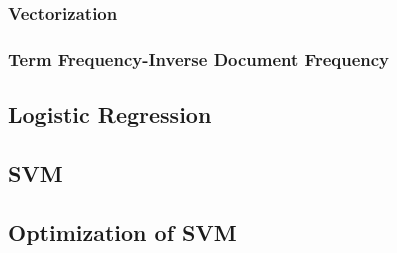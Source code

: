 \documentclass[11pt, a4paper, twocolumn]{article}
\begin{document}
\subsubsection{Vectorization}
\subsubsection{Term Frequency-Inverse Document Frequency}

\subsection{Logistic Regression}

\subsection{SVM}

\subsection{Optimization of SVM}
\end{document}
